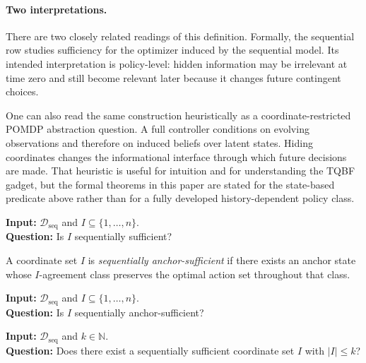\paragraph{Two interpretations.}
There are two closely related readings of this definition. Formally, the sequential row studies sufficiency for the optimizer induced by the sequential model. Its intended interpretation is policy-level: hidden information may be irrelevant at time zero and still become relevant later because it changes future contingent choices.

One can also read the same construction heuristically as a coordinate-restricted POMDP abstraction question. A full controller conditions on evolving observations and therefore on induced beliefs over latent states. Hiding coordinates changes the informational interface through which future decisions are made. That heuristic is useful for intuition and for understanding the TQBF gadget, but the formal theorems in this paper are stated for the state-based predicate above rather than for a fully developed history-dependent policy class.

\begin{problem}\label{prob:sequential-sufficiency}
\textbf{Input:} $\mathcal{D}_{\mathrm{seq}}$ and $I\subseteq\{1,\ldots,n\}$. \\
\textbf{Question:} Is $I$ sequentially sufficient?
\end{problem}

\begin{definition}\label{def:sequential-anchor-sufficient}
A coordinate set $I$ is \emph{sequentially anchor-sufficient} if there exists an anchor state whose $I$-agreement class preserves the optimal action set throughout that class.
\end{definition}

\begin{problem}\label{prob:sequential-anchor-sufficiency}
\textbf{Input:} $\mathcal{D}_{\mathrm{seq}}$ and $I\subseteq\{1,\ldots,n\}$. \\
\textbf{Question:} Is $I$ sequentially anchor-sufficient?
\end{problem}

\begin{problem}\label{prob:sequential-minimum-sufficient}
\textbf{Input:} $\mathcal{D}_{\mathrm{seq}}$ and $k\in\mathbb{N}$. \\
\textbf{Question:} Does there exist a sequentially sufficient coordinate set $I$ with $|I|\le k$?
\end{problem}

